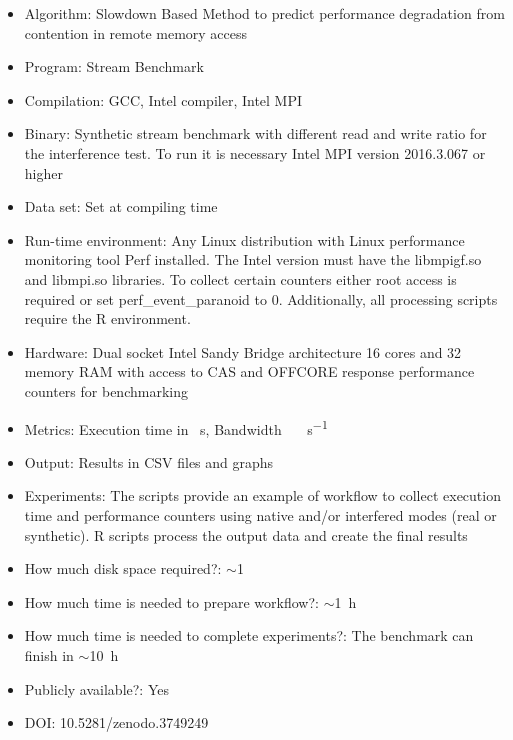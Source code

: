 \documentclass{sigplanconf}
\begin{document}
	\begin{itemize} 
		
		\item Algorithm: Slowdown Based Method to predict performance degradation from
		contention in remote memory access
		
		\item Program: Stream Benchmark
		
		\item Compilation: GCC, Intel compiler, Intel MPI 
		
		\item Binary: Synthetic stream benchmark with different read and write ratio for the
		interference test. To run it is necessary Intel MPI version 2016.3.067 or higher 
		
		\item Data set: Set at compiling time 
		
		\item Run-time environment: Any Linux distribution with Linux performance monitoring
		tool \textsf{Perf} installed. The Intel version must have the \textsf{libmpigf.so} and \textsf{libmpi.so} libraries. To collect certain counters either root access is
		required or set \textsf{perf\_event\_paranoid} to 0. Additionally, all processing
		scripts require the R environment.  
		
		\item Hardware: Dual socket Intel Sandy Bridge architecture 16 cores and
		\SI{32}{\giga\byte} memory RAM with access to CAS and OFFCORE response performance
		counters for benchmarking
		
		\item Metrics: Execution time in \SI{}{\second}, Bandwidth
		\SI{}{\giga\byte\per\second}
		
		\item Output: Results in CSV files and graphs 
		
		\item Experiments: The scripts provide an example of workflow to collect execution
		time and performance counters using native and/or interfered modes (real or
		synthetic). R scripts process the output data and create the final results 
		
		\item How much disk space required?: $\sim$\SI{1}{\giga\byte} 
		
		\item How much time is needed to prepare workflow?: $\sim$\SI{1}{\hour}
		
		\item How much time is needed to complete experiments?: The benchmark can finish in
		$\sim$\SI{10}{\hour}
		
		\item Publicly available?: Yes
		
		\item DOI: 10.5281/zenodo.3749249
		
	\end{itemize}
	
\end{document}
